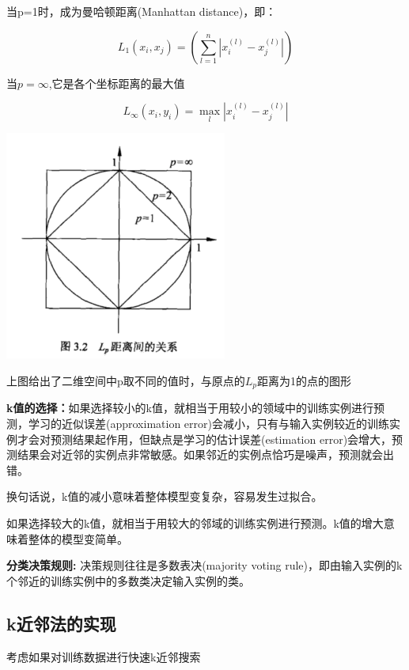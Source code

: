 \documentclass{ctexart}
\begin{document}
	当p=1时，成为曼哈顿距离(Manhattan distance)，即：
	
	\[L_1(x_i, x_j) = (\sum_{l=1}^{n} |x_i^{(l)} - x_j^{(l)}|)\]
	
	当\(p=\infty\),它是各个坐标距离的最大值
	
	\[L_\infty (x_i, y_i) = \max_l |x_i^{(l)} - x_j^{(l)}|\]
	
	\includegraphics[width=0.8\linewidth]{pic/distances_of_lp}
	
	上图给出了二维空间中p取不同的值时，与原点的\(L_p\)距离为1的点的图形
	
	\textbf{k值的选择：}如果选择较小的k值，就相当于用较小的领域中的训练实例进行预测，学习的近似误差(approximation error)会减小，只有与输入实例较近的训练实例才会对预测结果起作用，但缺点是学习的估计误差(estimation error)会增大，预测结果会对近邻的实例点非常敏感。如果邻近的实例点恰巧是噪声，预测就会出错。
	
	换句话说，k值的减小意味着整体模型变复杂，容易发生过拟合。
	
	如果选择较大的k值，就相当于用较大的邻域的训练实例进行预测。k值的增大意味着整体的模型变简单。
	
	\textbf{分类决策规则:} 决策规则往往是多数表决(majority voting rule)，即由输入实例的k个邻近的训练实例中的多数类决定输入实例的类。
	
	\subsection{k近邻法的实现}

	考虑如果对训练数据进行快速k近邻搜索
	
\end{document}
